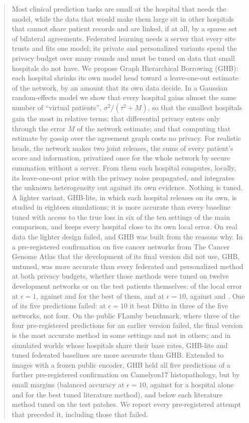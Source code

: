 \documentclass[acmsmall,screen,review]{acmart}
\theoremstyle{acmdefinition}
\begin{document}
\begin{abstract}
Most clinical prediction tasks are small at the hospital that needs the model, while the data that would make them large sit in other hospitals that cannot share patient records and are linked, if at all, by a sparse set of bilateral agreements. Federated learning needs a server that every site trusts and fits one model; its private and personalized variants spend the privacy budget over many rounds and must be tuned on data that small hospitals do not have. We propose Graph Hierarchical Borrowing (GHB): each hospital shrinks its own model head toward a leave-one-out estimate of the network, by an amount that its own data decide. In a Gaussian random-effects model we show that every hospital gains almost the same number of ``virtual patients'', $\sigma^2/(\tau^2+M)$, so that the smallest hospitals gain the most in relative terms; that differential privacy enters only through the error $M$ of the network estimate; and that computing that estimate by gossip over the agreement graph costs no privacy. For realistic heads, the network makes two joint releases, the sums of every patient's score and information, privatized once for the whole network by secure summation without a server. From them each hospital computes, locally, its leave-one-out prior with the privacy noise propagated, and integrates the unknown heterogeneity out against its own evidence. Nothing is tuned. A lighter variant, GHB-lite, in which each hospital releases on its own, is studied in eighteen simulations; it is more accurate than every baseline tuned with access to the true loss in six of the ten settings of the main comparison, and keeps every hospital close to its own local error. On real data the lighter design failed, and GHB was built from the reasons why. In a pre-registered confirmation on five cancer networks from The Cancer Genome Atlas that the development of its final version did not use, GHB, untuned, was more accurate than every federated and personalized method at both privacy budgets, whether those methods were tuned on twelve development networks or on the test patients themselves: \SimTCOneGHB{} of the local error at $\epsilon=1$, against \SimTCOneFT{} and \SimTCOneFTOrc{} for the best of them, and \SimTCTenGHB{} at $\epsilon=10$, against \SimTCTenDitto{} and \SimTCTenDittoOrc. One of its five predictions failed: at $\epsilon=10$ it beat Ditto in three of the five networks, not four. On the public FLamby benchmark, where three of the four pre-registered predictions for an earlier version failed, the final version is the most accurate method in some settings and not in others; and in simulated worlds whose hospitals share their base rates, GHB-lite and tuned federated baselines are more accurate than GHB. Extended to images with a frozen public encoder, GHB held all five predictions of a further pre-registered confirmation on Camelyon17 histopathology, but by small margins (balanced accuracy \SimCamTenGHB{} at $\epsilon=10$, against \SimCamLocal{} for a hospital alone and \SimCamTenBestReal{} for the best tuned literature method), and below each literature method tuned on the test patches. We report every pre-registered attempt that preceded it, including those that failed.
\end{abstract}
\end{document}
